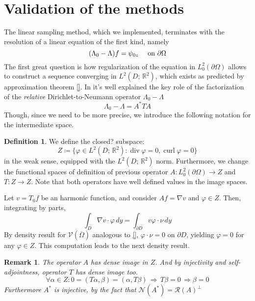 \documentclass[10pt, a4paper, twoside, openright]{book}
\theoremstyle{definition}
\newtheorem{definition}[subsection]{Definition}
\theoremstyle{plain}
\theoremstyle{plain}
\theoremstyle{plain}
\theoremstyle{plain}
\newtheorem{remark}[subsection]{Remark}
\theoremstyle{plain}
\theoremstyle{plain}
\theoremstyle{plain}
\theoremstyle{plain}
\DeclareMathOperator{\divergence}{div}
\DeclareMathOperator{\curl}{curl}
\let\phi\varphi
\begin{document}
\section{Validation of the methods}
\label{section:validation}
The linear sampling method, which we implemented, terminates with the resolution of a linear equation of the first kind, namely
\begin{equation}
\label{eq:NtoD_firstkind}
 (\Lambda_0 - \Lambda) f = \psi_{0z}\quad \textup{ on }\partial \Omega
\end{equation}
The first great question is how regularization of the equation in $L^2_0(\partial \Omega)$
allows to construct a sequence converging in $L^2(D;\,\mathbb{R}^2)$, which exists as predicted by approximation theorem \ref{}.
In \cite{arens:why} it's well explained the key role of the factorization 
of the \textit{relative} Dirichlet-to-Neumann operator $\Lambda_0 - \Lambda$
\begin{equation}
 \Lambda_0 - \Lambda = A^*TA
\end{equation}
Though, since we need to be more precise, we introduce the following notation for the intermediate space.
\begin{definition}
We define the closed? subspace:
\begin{equation}
 Z\coloneqq\bigl\{\phi\in L^2(D;\,\mathbb{R}^2):\divergence\phi=0, \curl\phi=0\bigr\}
\end{equation}
in the weak sense, equipped with the $L^2(D;\,\mathbb{R}^2)$ norm. Furthermore, we change the functional spaces of definition of previous operator $A:L^2_0(\partial \Omega)\to Z$ and $T:Z \to Z$. 
Note that both operators have well defined values in the image spaces.
\end{definition}
Let $v=T_0f$ be an harmonic function, and consider $Af=\nabla v$ and $\phi\in Z$. Then, integrating by parts,
\begin{equation}
 \int_D\nabla v\cdot \phi\,dy=\int_{\partial D}v \phi\cdot\nu\,dy
\end{equation}
By density result for $\mathcal{V}(\overline{\Omega})$ analogous to \ref{}, $\phi\cdot \nu=0$ on $\partial D$, yielding $\phi=0$ for any $\phi\in Z$.
This computation leads to the next density result.
\begin{remark}
 The operator $A$ has dense image in $Z$. And by injectivity and self-adjointness, operator $T$ has dense image too.
 \begin{equation}
  \forall\alpha\in Z: 0=(T\alpha,\beta)=(\alpha,T\beta)\,\Rightarrow \, T\beta = 0 \, \Rightarrow \beta=0
 \end{equation}
 Furthermore $A^*$ is injective, by the fact that $\mathcal{N}(A^*)=\mathcal{R}(A)^\perp$
\end{remark}
\end{document}
